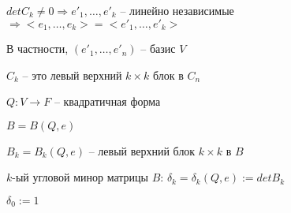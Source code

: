 $det C_k \neq 0 \Rightarrow e'_1, \dots, e'_k$ -- линейно независимые $\Rightarrow <e_1, \dots, e_k> = <e'_1, \dots, e'_k>$

В частности, $(e'_1, \dots, e'_n)$ -- базис $V$

$C_k$ -- это левый верхний $k \times k$ блок в $C_n$

\vspace{\baselineskip}
$Q: V \rightarrow F$ -- квадратичная форма

$B = B(Q, e)$

$B_k = B_k(Q, e)$ -- левый верхний блок $k \times k$ в $B$

$k$-ый угловой минор матрицы $B$: $\delta_k = \delta_k(Q, e) := detB_k$

$\delta_0 := 1$

